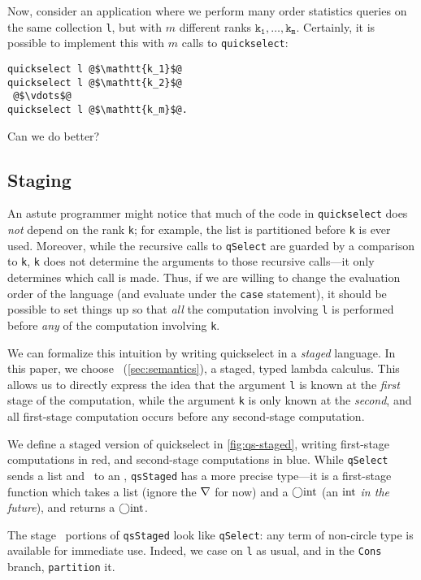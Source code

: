 \begin{abstrsyn}
Now, consider an application where we perform many order statistics queries on
the same collection \texttt{l}, but with $m$ different ranks
$\mathtt{k_1},\dots,\mathtt{k_m}$.
Certainly, it is possible to implement this with $m$ calls to
\texttt{quickselect}:
%
\begin{lstlisting}
quickselect l @$\mathtt{k_1}$@
quickselect l @$\mathtt{k_2}$@
 @$\vdots$@ 
quickselect l @$\mathtt{k_m}$@.
\end{lstlisting}
%
Can we do better?

\subsection{Staging}

An astute programmer might notice that much of the code in \texttt{quickselect}
does \emph{not} depend on the rank \texttt{k}; for example, the list is
partitioned before \texttt{k} is ever used. Moreover, while the recursive calls
to \texttt{qSelect} are guarded by a comparison to \texttt{k}, \texttt{k} does
not determine the arguments to those recursive calls---it only determines which
call is made. Thus, if we are willing to change the evaluation order of the
language (and evaluate under the \texttt{case} statement), it should be possible
to set things up so that \emph{all} the computation involving \texttt{l} is
performed before \emph{any} of the computation involving \texttt{k}.

We can formalize this intuition by writing quickselect in a \emph{staged}
language. In this paper, we choose \lang\ (\ref{sec:semantics}), a staged, typed
lambda calculus. This allows us to directly express the idea that the argument
\texttt{l} is known at the \emph{first} stage of the computation, while the
argument \texttt{k} is only known at the \emph{second}, and all
first-stage computation occurs before any second-stage computation.

We define a staged version of quickselect in \ref{fig:qs-staged}, writing
first-stage computations in red, and second-stage computations in blue. While
\texttt{qSelect} sends a \textrm{list} and \rmint\ to an \rmint,
\texttt{qsStaged} has a more precise type---it is a first-stage function which
takes a \textrm{list} (ignore the $\nabla$ for now) and a 
$\bigcirc{\rm int}$ (an ${\rm int}$ \emph{in the future}), and returns a $\bigcirc{\rm int}$. 

The stage \bbone\ portions of \texttt{qsStaged} look like \texttt{qSelect}: any
term of non-circle type is available for immediate use. Indeed, we case on
\texttt{l} as usual, and in the \texttt{Cons} branch, \texttt{partition} it.


\end{abstrsyn}
